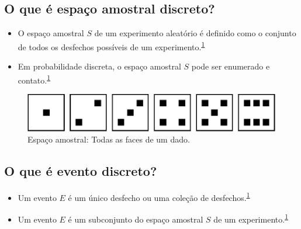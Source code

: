 \documentclass[
  a4paper,
]{book}
\begin{document}
\hypertarget{o-que-uxe9-espauxe7o-amostral-discreto}{%
\subsection{O que é espaço amostral discreto?}\label{o-que-uxe9-espauxe7o-amostral-discreto}}

\begin{itemize}
\item
  O espaço amostral \(S\) de um experimento aleatório é definido como o conjunto de todos os desfechos possíveis de um experimento.\textsuperscript{\protect\hyperlink{ref-grami2023}{1}}
\item
  Em probabilidade discreta, o espaço amostral \(S\) pode ser enumerado e contato.\textsuperscript{\protect\hyperlink{ref-grami2023}{1}}
\end{itemize}

\begin{figure}

{\centering \includegraphics{Ciencia-com-R_files/figure-latex/espaco-amostral-dado-1} 

}

\caption{Espaço amostral: Todas as faces de um dado.}\label{fig:espaco-amostral-dado}
\end{figure}

\hypertarget{o-que-uxe9-evento-discreto}{%
\subsection{O que é evento discreto?}\label{o-que-uxe9-evento-discreto}}

\begin{itemize}
\item
  Um evento \(E\) é um único desfecho ou uma coleção de desfechos.\textsuperscript{\protect\hyperlink{ref-grami2023}{1}}
\item
  Um evento \(E\) é um subconjunto do espaço amostral \(S\) de um experimento.\textsuperscript{\protect\hyperlink{ref-grami2023}{1}}
\end{itemize}
\end{document}
